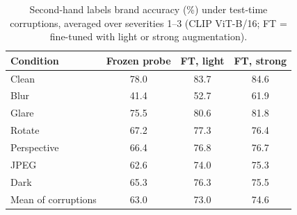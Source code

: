 \begin{table}[t]\centering\small
\caption{Second-hand labels brand accuracy (\%) under test-time corruptions, averaged over severities 1--3 (CLIP ViT-B/16; FT = fine-tuned with light or strong augmentation).}\label{tab:robustness_secondhand_labels}
\begin{tabular}{lccc}\toprule
Condition & Frozen probe & FT, light & FT, strong \\\midrule
Clean & 78.0 & 83.7 & 84.6 \\\midrule
Blur & 41.4 & 52.7 & 61.9 \\
Glare & 75.5 & 80.6 & 81.8 \\
Rotate & 67.2 & 77.3 & 76.4 \\
Perspective & 66.4 & 76.8 & 76.7 \\
JPEG & 62.6 & 74.0 & 75.3 \\
Dark & 65.3 & 76.3 & 75.5 \\
\midrule Mean of corruptions & 63.0 & 73.0 & 74.6 \\
\bottomrule\end{tabular}\end{table}
